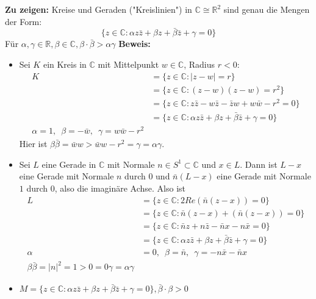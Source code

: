 \begin{problem*}[1]
\textbf{Zu zeigen:} Kreise und Geraden ("Kreislinien") in $ \mathbb{C} \cong \mathbb{R}^2$ sind genau die Mengen der Form:
\begin{equation*}
	\{ z \in \mathbb{C} : \alpha z \bar{z}+ \beta z + \bar{\beta}\bar{z}  + \gamma = 0\} 
\end{equation*}
Für $\alpha, \gamma \in \mathbb{R}, \beta \in \mathbb{C}, \beta \cdot \bar{ \beta } > \alpha \gamma$
\textbf{Beweis:}
\begin{itemize}
	\item Sei $ K $ ein Kreis in $\mathbb{C}$ mit Mittelpunkt $w \in \mathbb{C}$, Radius $r < 0$:
	\begin{align*}	
	K &= \{ z \in \mathbb{C} : \vert z - w \vert = r \} \\
	&= \{ z \in \mathbb{C} : (z - w)(z-w) = r^2\} \\
	&= \{ z \in \mathbb{C} : z \bar{z} - w \bar{z} - \bar{z} w + w \bar{w} - r^2 = 0 \} \\
	&= \{ z \in \mathbb{C} : \alpha z \bar{z} + \beta z + \bar{\beta} \bar{z} + \gamma = 0 \} \\
	\alpha = 1, \enspace \beta = - \bar{w}, \enspace \gamma = w \bar{w} - r^2
	\end{align*}
	Hier ist $\beta \bar{\beta} = \bar{w}w > \bar{w} w - r^2 = \gamma = \alpha \gamma$.
	\item Sei $ L $ eine Gerade in $\mathbb{C}$ mit Normale $n \in S^1 \subset \mathbb{C}$ und $ x \in L$. Dann ist $L - x$ eine Gerade mit Normale $n$ durch $ 0 $ und $\bar{n}(L -x)$ eine Gerade mit Normale $ 1 $ durch $ 0 $, also die imaginäre Achse.
	Also ist 
	\begin{align*}
	L &= \{ z \in \mathbb{C}: 2 Re(\bar{n}(z - x)) = 0 \} \\
	&= \{ z \in \mathbb{C}: \bar{n}(z-x) + (\bar{n}(z - x)) = 0 \} \\
	&= \{ z \in \mathbb{C}: \bar{n}z + n \bar{z} - \bar{n}x - n \bar{x}= 0 \} \\
	&= \{ z \in \mathbb{C}: \alpha z \bar{z} + \beta z + \bar{\beta} \bar{z} + \gamma = 0 \} \\
	\alpha &= 0, \enspace \beta = \bar{n}, \enspace \gamma = -n \bar{x} - \bar{n} x \\
	\beta \bar{\beta} = \vert n \vert^2 = 1 > 0 = 0 \gamma = \alpha \gamma
	 \end{align*} 
	\item $M = \{ z \in \mathbb{C} : \alpha z \bar{z} + \beta z + \bar{\beta} \bar{z} + \gamma = 0 \}, \bar{\beta} \cdot \beta > 0$

\end{itemize}
\end{problem*}
